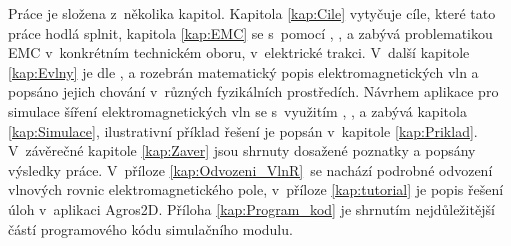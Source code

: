 Práce je složena z~několika kapitol. Kapitola \ref{kap:Cile} vytyčuje cíle, které tato práce hodlá splnit, kapitola \ref{kap:EMC} se s~pomocí \cite{emc_trakce}, \cite{nfr}, \cite{emc_encyklopedie} a \cite{csn} zabývá problematikou EMC v~konkrétním technickém oboru, v~elektrické trakci. V~další kapitole \ref{kap:Evlny} je dle \cite{emp}, \cite{umt} a \cite{tripak} rozebrán matematický popis elektromagnetických vln a popsáno jejich chování v~různých fyzikálních prostředích. Návrhem aplikace pro simulace šíření elektromagnetických vln se s~využitím \cite{num}, \cite{hpfem}, \cite{gk_kaw} a \cite{gk_tichy} zabývá kapitola \ref{kap:Simulace}, ilustrativní příklad řešení je popsán v~kapitole \ref{kap:Priklad}. V~závěrečné kapitole \ref{kap:Zaver} jsou shrnuty dosažené poznatky a popsány výsledky práce. V~příloze \ref{kap:Odvozeni_VlnR}~se nachází podrobné odvození vlnových rovnic elektromagnetického pole, v~příloze \ref{kap:tutorial} je popis řešení úloh v~aplikaci Agros2D. Příloha \ref{kap:Program_kod} je shrnutím nejdůležitější částí programového kódu simulačního modulu.

